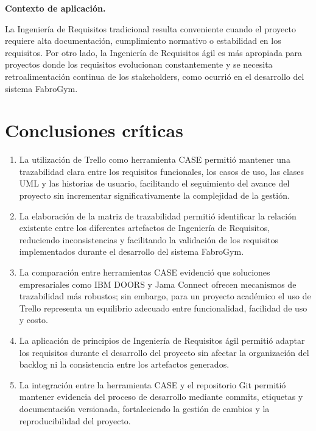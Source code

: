 \documentclass[11pt,a4paper]{article}
\begin{document}
\textbf{Contexto de aplicación.}

La Ingeniería de Requisitos tradicional resulta conveniente cuando el proyecto requiere alta documentación, cumplimiento normativo o estabilidad en los requisitos. Por otro lado, la Ingeniería de Requisitos ágil es más apropiada para proyectos donde los requisitos evolucionan constantemente y se necesita retroalimentación continua de los stakeholders, como ocurrió en el desarrollo del sistema FabroGym.

\section{Conclusiones críticas}
\begin{enumerate}

\item La utilización de Trello como herramienta CASE permitió mantener una trazabilidad clara entre los requisitos funcionales, los casos de uso, las clases UML y las historias de usuario, facilitando el seguimiento del avance del proyecto sin incrementar significativamente la complejidad de la gestión.

\item La elaboración de la matriz de trazabilidad permitió identificar la relación existente entre los diferentes artefactos de Ingeniería de Requisitos, reduciendo inconsistencias y facilitando la validación de los requisitos implementados durante el desarrollo del sistema FabroGym.

\item La comparación entre herramientas CASE evidenció que soluciones empresariales como IBM DOORS y Jama Connect ofrecen mecanismos de trazabilidad más robustos; sin embargo, para un proyecto académico el uso de Trello representa un equilibrio adecuado entre funcionalidad, facilidad de uso y costo.

\item La aplicación de principios de Ingeniería de Requisitos ágil permitió adaptar los requisitos durante el desarrollo del proyecto sin afectar la organización del backlog ni la consistencia entre los artefactos generados.

\item La integración entre la herramienta CASE y el repositorio Git permitió mantener evidencia del proceso de desarrollo mediante commits, etiquetas y documentación versionada, fortaleciendo la gestión de cambios y la reproducibilidad del proyecto.

\end{enumerate}
\end{document}
